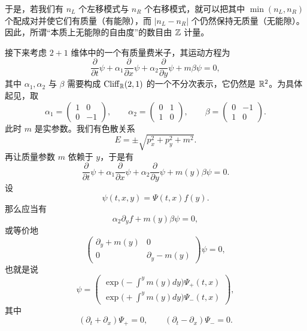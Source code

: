于是，若我们有 $n_L$ 个左移模式与 $n_R$ 个右移模式，就可以把其中 $\min(n_L,n_R)$ 个配成对并使它们有质量（有能隙），而 $|n_L-n_R|$ 个仍然保持无质量（无能隙）。因此，所谓“本质上无能隙的自由度”的数目由 $\mathbb{Z}$ 计量。

接下来考虑 $2+1$ 维体中的一个有质量费米子，其运动方程为
\begin{equation}
\frac{\partial}{\partial t}\psi+\alpha_1\frac{\partial}{\partial x}\psi+\alpha_2\frac{\partial}{\partial y}\psi+m\beta\psi=0, \tag{11.6}
\end{equation}
其中 $\alpha_1,\alpha_2$ 与 $\beta$ 需要构成 $\mathrm{Cliff}_{\mathbb{R}}(2,1)$ 的一个不分次表示，它仍然是 $\mathbb{R}^2$。为具体起见，取
\begin{equation}
\alpha_1=\begin{pmatrix}1&0\\0&-1\end{pmatrix},\qquad
\alpha_2=\begin{pmatrix}0&1\\1&0\end{pmatrix},\qquad
\beta=\begin{pmatrix}0&-1\\1&0\end{pmatrix}. \tag{11.7}
\end{equation}
此时 $m$ 是实参数。我们有色散关系
\begin{equation}
E=\pm\sqrt{p_x^2+p_y^2+m^2}. \tag{11.8}
\end{equation}
再让质量参数 $m$ 依赖于 $y$，于是有
\begin{equation}
\frac{\partial}{\partial t}\psi+\alpha_1\frac{\partial}{\partial x}\psi+\alpha_2\frac{\partial}{\partial y}\psi+m(y)\beta\psi=0. \tag{11.9}
\end{equation}
设
\begin{equation}
\psi(t,x,y)=\Psi(t,x)f(y). \tag{11.10}
\end{equation}
那么应当有
\begin{equation}
\alpha_2\partial_y f+m(y)\beta\psi=0, \tag{11.11}
\end{equation}
或等价地
\begin{equation}
\begin{pmatrix}\partial_y+m(y)&0\\0&\partial_y-m(y)\end{pmatrix}\psi=0, \tag{11.12}
\end{equation}
也就是说
\begin{equation}
\psi=\begin{pmatrix}\exp\!\big(-\int^y m(y)dy\big)\Psi_+(t,x)\\[2pt]
\exp\!\big(+\int^y m(y)dy\big)\Psi_-(t,x)\end{pmatrix}, \tag{11.13}
\end{equation}
其中
\begin{equation}
(\partial_t+\partial_x)\Psi_+=0,\qquad (\partial_t-\partial_x)\Psi_-=0. \tag{11.14}
\end{equation}

